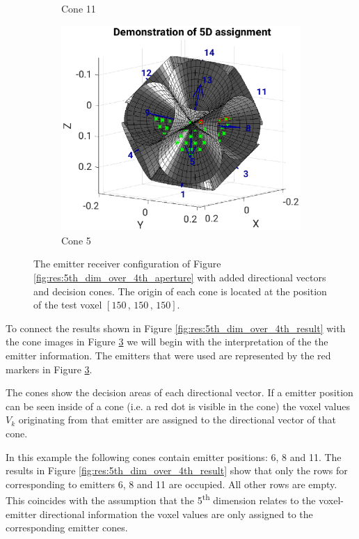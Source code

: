 \begin{figure}[H]
\begin{subfigure}[b]{0.49\textwidth}
         \caption{Cone 11}
         \label{fig:res:5th_4th_cones11}
     \end{subfigure}
     \hfill
     \begin{subfigure}[b]{0.49\textwidth}
         \centering
         \includegraphics[width=1.3\textwidth]{Graphics/Results/4d_5d/5thDim_over_4thDim_150_150_150_cones_9_8_center.eps}
         \caption{Cone 5}
         \label{fig:res:5th_4th_cones5}
     \end{subfigure}
        \caption{The emitter receiver configuration of Figure \ref{fig:res:5th_dim_over_4th_aperture} with added directional vectors and decision cones. The origin of each cone is located at the position of the test voxel $[150\, , \, 150\, , \, 150]$. }
        \label{fig:res:5th_4th_cones}
\end{figure}

To connect the results shown in Figure \ref{fig:res:5th_dim_over_4th_result} with the cone images in Figure \ref{fig:res:5th_4th_cones} we will begin with the interpretation of the the emitter information. The emitters that were used are represented by the red markers in Figure \ref{fig:res:5th_4th_cones}.   

The cones show the decision areas of each directional vector. If a emitter position can be seen inside of a cone (i.e. a red dot is visible in the cone) the voxel values $V_k$ originating from that emitter are assigned to the directional vector of that cone.  

In this example the following cones contain emitter positions: 6, 8 and 11. The results in Figure \ref{fig:res:5th_dim_over_4th_result} show that only the rows for corresponding to emitters 6, 8 and 11 are occupied. All other rows are empty. This coincides with the assumption that the 5\textsuperscript{th} dimension relates to the voxel-emitter directional information the voxel values are only assigned to the corresponding emitter cones.

